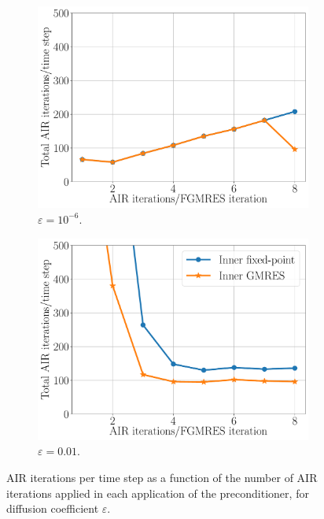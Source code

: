 \documentclass[a4paper,10pt]{article}
\begin{document}
\begin{figure}[h!]
\centering

  \centering
  \begin{subfigure}[b]{0.475\textwidth}
	\includegraphics[width = \textwidth]{./figures/dg_advdiff_o2_1e-6.pdf}
	\caption{$\varepsilon = 10^{-6}$.}
	\label{fig:dg_o2_1e-6}
  \end{subfigure}
   \begin{subfigure}[b]{0.475\textwidth}
	\includegraphics[width = \textwidth]{./figures/dg_advdiff_o2_1e-2.pdf}
	\caption{$\varepsilon = 0.01$.}
	\label{fig:dg_o2_1e-2}
  \end{subfigure}
\caption{AIR iterations per time step as a function of the number of
AIR iterations applied in each application of the preconditioner, for
diffusion coefficient $\varepsilon$.}
\label{fig:dg_o2}
\end{figure}
\end{document}
